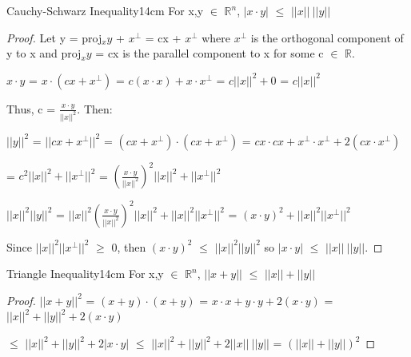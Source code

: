     \newpage



    \begin{wtheorem}{Cauchy-Schwarz Inequality}{14cm}
        For x,y $\in$ $\mathbb{R}^n$,
        $|x \cdot y|$ $\leq$ $||x|| \ ||y||$
    \end{wtheorem}

    \begin{proof}
        Let y = proj$_xy$ + $x^{\perp}$ = cx + $x^{\perp}$
        where $x^{\perp}$ is the orthogonal component of y to x and
        proj$_xy$ = cx is the parallel component to x for some c $\in$ $\mathbb{R}$.

        \hspace{0.5cm}
        $x \cdot y$
        = $x \cdot (cx + x^{\perp})$
        = $c(x \cdot x) + x \cdot x^{\perp}$
        = $c||x||^2 + 0$
        = $c||x||^2$

        Thus, c = $\frac{x \cdot y}{||x||^2}$. Then:

        \hspace{0.5cm}
        $||y||^2$
        = $||cx+x^{\perp}||^2$
        = $(cx+x^{\perp}) \cdot (cx+x^{\perp})$
        = $cx \cdot cx + x^{\perp} \cdot x^{\perp} + 2(cx \cdot x^{\perp})$

        \hspace{1.5cm}
        = $c^2||x||^2 + ||x^{\perp}||^2$
        = $(\frac{x \cdot y}{||x||^2})^2 ||x||^2 + ||x^{\perp}||^2$

        \hspace{0.5cm}
        $||x||^2 ||y||^2$
        = $||x||^2(\frac{x \cdot y}{||x||^2})^2 ||x||^2 + ||x||^2 ||x^{\perp}||^2$
        = $(x \cdot y)^2 + ||x||^2 ||x^{\perp}||^2$

        Since $||x||^2 ||x^{\perp}||^2$ $\geq$ 0, then
        $(x \cdot y)^2$ $\leq$ $||x||^2 ||y||^2$
        so $|x \cdot y|$ $\leq$ $||x|| \ ||y||$.
    \end{proof}

    \vspace{0.5cm}



    \begin{wtheorem}{Triangle Inequality}{14cm}
        For x,y $\in$ $\mathbb{R}^n$,
        $||x+y||$ $\leq$ $||x|| + ||y||$
    \end{wtheorem}

    \begin{proof}
        $||x+y||^2$
        = $(x+y) \cdot (x+y)$
        = $x \cdot x + y \cdot y + 2(x \cdot y)$
        = $||x||^2 + ||y||^2 +2(x \cdot y)$

        \hspace{1.55cm}
        $\leq$ $||x||^2 + ||y||^2 +2|x \cdot y|$
        $\leq$ $||x||^2 + ||y||^2 +2||x|| \ ||y||$
        = $(||x|| + ||y||)^2$
    \end{proof}

